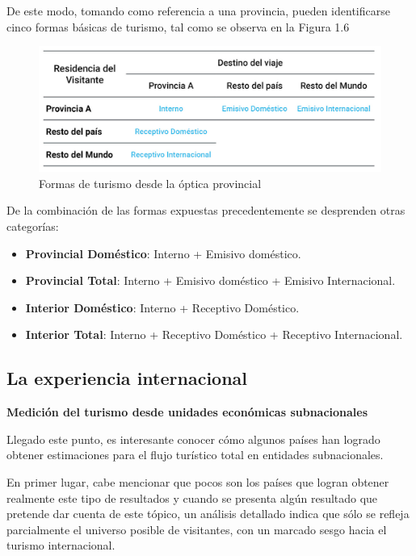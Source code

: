 \documentclass[
  openany]{book}
\begin{document}
De este modo, tomando como referencia a una provincia, pueden identificarse cinco formas básicas de turismo, tal como se observa en la Figura 1.6

\begin{figure}

{\centering \includegraphics[width=1\linewidth]{imagenes/figura1.6} 

}

\caption{Formas de turismo desde la óptica provincial}\label{fig:formasturismo}
\end{figure}

De la combinación de las formas expuestas precedentemente se desprenden otras categorías:

\begin{itemize}
\item
  \textbf{Provincial Doméstico}: Interno + Emisivo doméstico.
\item
  \textbf{Provincial Total}: Interno + Emisivo doméstico + Emisivo Internacional.
\item
  \textbf{Interior Doméstico}: Interno + Receptivo Doméstico.
\item
  \textbf{Interior Total}: Interno + Receptivo Doméstico + Receptivo Internacional.
\end{itemize}

\hypertarget{la-experiencia-internacional}{%
\subsection{La experiencia internacional}\label{la-experiencia-internacional}}

\textbf{Medición del turismo desde unidades económicas subnacionales}

Llegado este punto, es interesante conocer cómo algunos países han logrado obtener estimaciones para el flujo turístico total en entidades subnacionales.

En primer lugar, cabe mencionar que pocos son los países que logran obtener realmente este tipo de resultados y cuando se presenta algún resultado que pretende dar cuenta de este tópico, un análisis detallado indica que sólo se refleja parcialmente el universo posible de visitantes, con un marcado sesgo hacia el turismo internacional.
\end{document}
